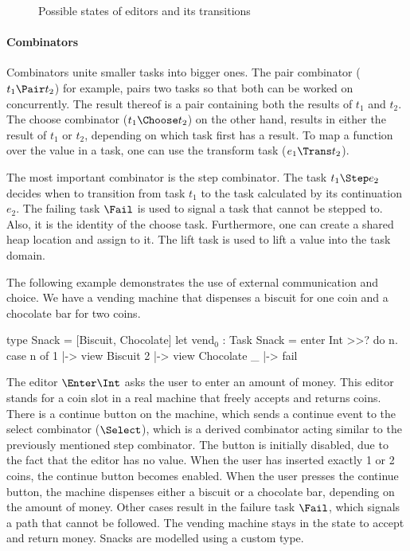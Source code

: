 \begin{figure}
  
  \caption{Possible states of editors and its transitions}
  \label{fig:editor-state}
\end{figure}

\paragraph{Combinators}

Combinators unite smaller tasks into bigger ones.
The pair combinator ($t_1 \Pair t_2$) for example,
pairs two tasks so that both can be worked on concurrently.
The result thereof is a pair containing both the results of $t_1$ and $t_2$.
The choose combinator ($t_1 \Choose t_2$) on the other hand,
results in either the result of $t_1$ or $t_2$,
depending on which task first has a result.
To map a function over the value in a task,
one can use the transform task ($e_1 \Trans t_2$).

The most important combinator is the step combinator.
The task $t_1 \Step e_2$ decides when to transition from task $t_1$
to the task calculated by its continuation $e_2$.
The failing task $\Fail$ is used to signal a task that cannot be stepped to.
Also, it is the identity of the choose task.
Furthermore, one can create a shared heap location and assign to it.
The lift task is used to lift a value into the task domain.


\begin{example}
  \label{exm:vending-base}
  The following example demonstrates the use of external communication and choice.
  We have a vending machine that dispenses a biscuit for one coin and a chocolate bar for two coins.
  \begin{TASK}
    type Snack = [Biscuit, Chocolate]
    let vend$_0$ : Task Snack = enter Int >>? do n.
      case n of
        1 |-> view Biscuit
        2 |-> view Chocolate
        _ |-> fail
  \end{TASK}
  The editor $\Enter \Int$ asks the user to enter an amount of money.
  This editor stands for a coin slot in a real machine that freely accepts and returns coins.
  There is a continue button on the machine, which sends a continue event to the select combinator ($\Select$),
  which is a derived combinator acting similar to the previously mentioned step combinator.
  The button is initially disabled, due to the fact that the editor has no value.
  When the user has inserted exactly 1 or 2 coins, the continue button becomes enabled.
  When the user presses the continue button, the machine dispenses either a biscuit or a chocolate bar, depending on the amount of money.
  Other cases result in the failure task $\Fail$, which signals a path that cannot be followed.
  The vending machine stays in the state to accept and return money.
  Snacks are modelled using a custom type.
\end{example}

